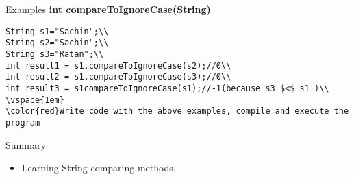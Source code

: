 \documentclass[aspectratio=169,14pt,usenames,dvipsnames]{beamer}
\begin{document}
\begin{frame}{Examples}
\textbf{int compareToIgnoreCase(String)}\\
\begin{lstlisting}
String s1="Sachin";\\
String s2="Sachin";\\
String s3="Ratan";\\
int result1 = s1.compareToIgnoreCase(s2);//0\\
int result2 = s1.compareToIgnoreCase(s3);//0\\
int result3 = s1compareToIgnoreCase(s1);//-1(because s3 $<$ s1 )\\
\vspace{1em}
\color{red}Write code with the above examples, compile and execute the program
\end{lstlisting}
\end{frame}

\begin{frame}{Summary}
\begin{itemize}
    \item Learning String comparing methods.
\end{itemize}
\end{frame}
\end{document}
